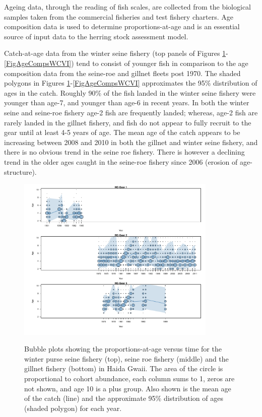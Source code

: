 	Ageing data, through the reading of fish scales, are collected from the biological samples taken from the commercial fisheries and test fishery charters. Age composition data is used to determine proportions-at-age and is an essential source of input data to the herring stock assessment model.
	
	Catch-at-age data from the winter seine fishery (top panels of Figures \ref{FigAgeCompsHG}-\ref{FigAgeCompsWCVI}) tend to consist of younger fish in comparison to the age composition data from the seine-roe and gillnet fleets post 1970. The shaded polygons in Figures \ref{FigAgeCompsHG}-\ref{FigAgeCompsWCVI} approximates the 95\% distribution of ages in the catch.  Roughly 90\% of the fish landed in the winter seine fishery were younger than age-7, and younger than age-6 in recent years.  In both the winter seine and seine-roe fishery age-2 fish are frequently landed; whereas, age-2 fish are rarely landed in the gillnet fishery, and fish do not appear to fully recruit to the gear until at least 4-5 years of age.  The mean age of the catch appears to be increasing between 2008 and 2010 in both the gillnet and winter seine fishery, and there is no obvious trend in the seine roe fishery.  There is however a declining trend in the older ages caught in the seine-roe fishery since 2006 (erosion of age-structure).

\begin{figure}
	\centering
	\includegraphics[width=0.85\textwidth]{../Figs/iscam_fig_AgeCompsHG.pdf}\\
	\caption{Bubble plots showing the proportions-at-age versus time for the winter purse seine fishery (top), seine roe fishery (middle) and the gillnet fishery (bottom) in Haida Gwaii.  The area of the circle is proportional to cohort abundance, each column sums to 1, zeros are not shown, and age 10 is a plus group. Also shown is the mean age of the catch (line) and the approximate 95\% distribution of ages (shaded polygon) for each year.}\label{FigAgeCompsHG}
\end{figure}

